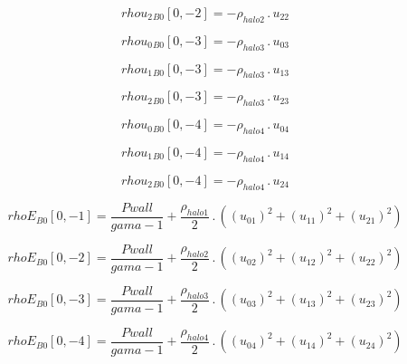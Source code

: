 \documentclass{article}
\begin{document}
\begin{dmath}{rhou_{2}{_{B0}}}[{0,-2}] = - \rho_{halo 2} \,.\, u_{22}\end{dmath}

\begin{dmath}{rhou_{0}{_{B0}}}[{0,-3}] = - \rho_{halo 3} \,.\, u_{03}\end{dmath}

\begin{dmath}{rhou_{1}{_{B0}}}[{0,-3}] = - \rho_{halo 3} \,.\, u_{13}\end{dmath}

\begin{dmath}{rhou_{2}{_{B0}}}[{0,-3}] = - \rho_{halo 3} \,.\, u_{23}\end{dmath}

\begin{dmath}{rhou_{0}{_{B0}}}[{0,-4}] = - \rho_{halo 4} \,.\, u_{04}\end{dmath}

\begin{dmath}{rhou_{1}{_{B0}}}[{0,-4}] = - \rho_{halo 4} \,.\, u_{14}\end{dmath}

\begin{dmath}{rhou_{2}{_{B0}}}[{0,-4}] = - \rho_{halo 4} \,.\, u_{24}\end{dmath}

\begin{dmath}{rhoE{_{B0}}}[{0,-1}] = \frac{Pwall}{gama - 1} + \frac{\rho_{halo 1}}{2} \,.\, \left(\left(u_{01} \right)^{2} + \left(u_{11} \right)^{2} + \left(u_{21} \right)^{2}\right)\end{dmath}

\begin{dmath}{rhoE{_{B0}}}[{0,-2}] = \frac{Pwall}{gama - 1} + \frac{\rho_{halo 2}}{2} \,.\, \left(\left(u_{02} \right)^{2} + \left(u_{12} \right)^{2} + \left(u_{22} \right)^{2}\right)\end{dmath}

\begin{dmath}{rhoE{_{B0}}}[{0,-3}] = \frac{Pwall}{gama - 1} + \frac{\rho_{halo 3}}{2} \,.\, \left(\left(u_{03} \right)^{2} + \left(u_{13} \right)^{2} + \left(u_{23} \right)^{2}\right)\end{dmath}

\begin{dmath}{rhoE{_{B0}}}[{0,-4}] = \frac{Pwall}{gama - 1} + \frac{\rho_{halo 4}}{2} \,.\, \left(\left(u_{04} \right)^{2} + \left(u_{14} \right)^{2} + \left(u_{24} \right)^{2}\right)\end{dmath}
\end{document}
